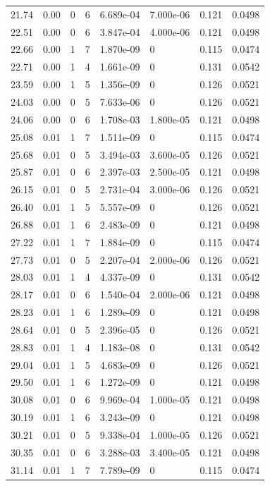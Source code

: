\documentclass[preview]{standalone}
\begin{document}
{{{\begin{tabular}{L{1.2cm}C{1.2cm} C{0.3cm}C{0.5cm} C{1.4cm}C{1.4cm} C{1.4cm}C{1.4cm}}
  21.74  &  0.00  & 0     &  6 &  6.689e-04  & 7.000e-06  & 0.121 &  0.0498   \\ 
  22.51  &  0.00  & 0     &  6 &  3.847e-04  & 4.000e-06  & 0.121 &  0.0498   \\ 
  22.66  &  0.00  & 1     &  7 &  1.870e-09  & 0  & 0.115 &  0.0474   \\ 
  22.71  &  0.00  & 1     &  4 &  1.661e-09  & 0  & 0.131 &  0.0542   \\ 
  23.59  &  0.00  & 1     &  5 &  1.356e-09  & 0  & 0.126 &  0.0521   \\ 
  24.03  &  0.00  & 0     &  5 &  7.633e-06  & 0  & 0.126 &  0.0521   \\ 
  24.06  &  0.00  & 0     &  6 &  1.708e-03  & 1.800e-05  & 0.121 &  0.0498   \\ 
  25.08  &  0.01  & 1     &  7 &  1.511e-09  & 0  & 0.115 &  0.0474   \\ 
  25.68  &  0.01  & 0     &  5 &  3.494e-03  & 3.600e-05  & 0.126 &  0.0521   \\ 
  25.87  &  0.01  & 0     &  6 &  2.397e-03  & 2.500e-05  & 0.121 &  0.0498   \\ 
  26.15  &  0.01  & 0     &  5 &  2.731e-04  & 3.000e-06  & 0.126 &  0.0521   \\ 
  26.40  &  0.01  & 1     &  5 &  5.557e-09  & 0  & 0.126 &  0.0521   \\ 
  26.88  &  0.01  & 1     &  6 &  2.483e-09  & 0  & 0.121 &  0.0498   \\ 
  27.22  &  0.01  & 1     &  7 &  1.884e-09  & 0  & 0.115 &  0.0474   \\ 
  27.73  &  0.01  & 0     &  5 &  2.207e-04  & 2.000e-06  & 0.126 &  0.0521   \\ 
  28.03  &  0.01  & 1     &  4 &  4.337e-09  & 0  & 0.131 &  0.0542   \\ 
  28.17  &  0.01  & 0     &  6 &  1.540e-04  & 2.000e-06  & 0.121 &  0.0498   \\ 
  28.23  &  0.01  & 1     &  6 &  1.289e-09  & 0  & 0.121 &  0.0498   \\ 
  28.64  &  0.01  & 0     &  5 &  2.396e-05  & 0  & 0.126 &  0.0521   \\ 
  28.83  &  0.01  & 1     &  4 &  1.183e-08  & 0  & 0.131 &  0.0542   \\ 
  29.04  &  0.01  & 1     &  5 &  4.683e-09  & 0  & 0.126 &  0.0521   \\ 
  29.50  &  0.01  & 1     &  6 &  1.272e-09  & 0  & 0.121 &  0.0498   \\ 
  30.08  &  0.01  & 0     &  6 &  9.969e-04  & 1.000e-05  & 0.121 &  0.0498   \\ 
  30.19  &  0.01  & 1     &  6 &  3.243e-09  & 0  & 0.121 &  0.0498   \\ 
  30.21  &  0.01  & 0     &  5 &  9.338e-04  & 1.000e-05  & 0.126 &  0.0521   \\ 
  30.35  &  0.01  & 0     &  6 &  3.288e-03  & 3.400e-05  & 0.121 &  0.0498   \\ 
  31.14  &  0.01  & 1     &  7 &  7.789e-09  & 0  & 0.115 &  0.0474   \\ 
\hline 
\end{tabular} 

}}}
\end{document}
